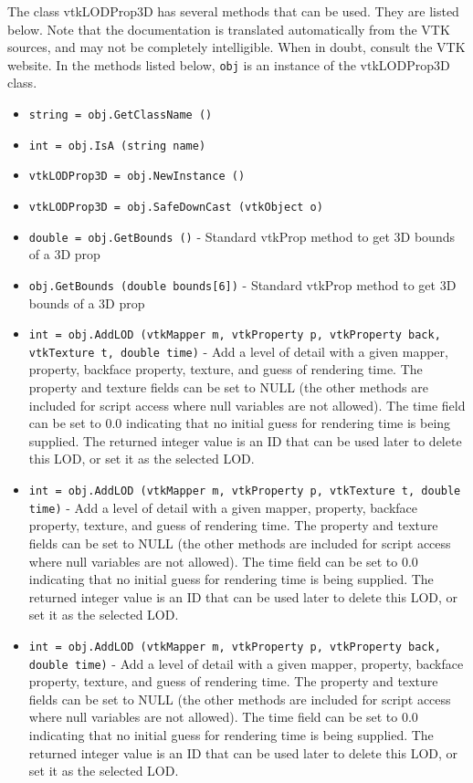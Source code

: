 The class vtkLODProp3D has several methods that can be used.
  They are listed below.
Note that the documentation is translated automatically from the VTK sources,
and may not be completely intelligible.  When in doubt, consult the VTK website.
In the methods listed below, \verb|obj| is an instance of the vtkLODProp3D class.
\begin{itemize}
\item  \verb|string = obj.GetClassName ()|

\item  \verb|int = obj.IsA (string name)|

\item  \verb|vtkLODProp3D = obj.NewInstance ()|

\item  \verb|vtkLODProp3D = obj.SafeDownCast (vtkObject o)|

\item  \verb|double = obj.GetBounds ()| -  Standard vtkProp method to get 3D bounds of a 3D prop

\item  \verb|obj.GetBounds (double bounds[6])| -  Standard vtkProp method to get 3D bounds of a 3D prop

\item  \verb|int = obj.AddLOD (vtkMapper m, vtkProperty p, vtkProperty back, vtkTexture t, double time)| -  Add a level of detail with a given mapper, property, backface property,
 texture, and guess of rendering time.  The property and texture fields
 can be set to NULL (the other methods are included for script access
 where null variables are not allowed). The time field can be set to 0.0
 indicating that no initial guess for rendering time is being supplied.
 The returned integer value is an ID that can be used later to delete
 this LOD, or set it as the selected LOD.

\item  \verb|int = obj.AddLOD (vtkMapper m, vtkProperty p, vtkTexture t, double time)| -  Add a level of detail with a given mapper, property, backface property,
 texture, and guess of rendering time.  The property and texture fields
 can be set to NULL (the other methods are included for script access
 where null variables are not allowed). The time field can be set to 0.0
 indicating that no initial guess for rendering time is being supplied.
 The returned integer value is an ID that can be used later to delete
 this LOD, or set it as the selected LOD.

\item  \verb|int = obj.AddLOD (vtkMapper m, vtkProperty p, vtkProperty back, double time)| -  Add a level of detail with a given mapper, property, backface property,
 texture, and guess of rendering time.  The property and texture fields
 can be set to NULL (the other methods are included for script access
 where null variables are not allowed). The time field can be set to 0.0
 indicating that no initial guess for rendering time is being supplied.
 The returned integer value is an ID that can be used later to delete
 this LOD, or set it as the selected LOD.


\end{itemize}
